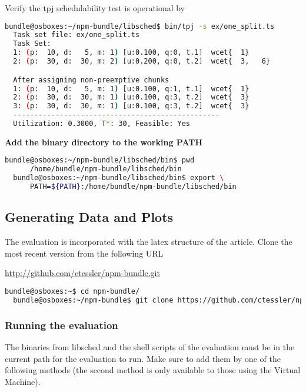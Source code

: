 \documentclass[a4paper]{article}
\begin{document}
{\noindent}Verify the tpj schedulability test is operational by
\begin{lstlisting}[language=bash]
  bundle@osboxes:~/npm-bundle/libsched$ bin/tpj -s ex/one_split.ts
  Task set file: ex/one_split.ts
  Task Set:
  1: (p:  10, d:   5, m: 1) [u:0.100, q:0, t.1]  wcet{  1}
  2: (p:  30, d:  30, m: 2) [u:0.200, q:0, t.2]  wcet{  3,   6}

  After assigning non-preemptive chunks
  1: (p:  10, d:   5, m: 1) [u:0.100, q:1, t.1]  wcet{  1}
  2: (p:  30, d:  30, m: 1) [u:0.100, q:3, t.2]  wcet{  3}
  3: (p:  30, d:  30, m: 1) [u:0.100, q:3, t.2]  wcet{  3}
  -------------------------------------------------
  Utilization: 0.3000, T*: 30, Feasible: Yes
\end{lstlisting}

{\noindent}\textbf{Add the binary directory to the working PATH}
\begin{lstlisting}[language=bash]
  bundle@osboxes:~/npm-bundle/libsched/bin$ pwd
      /home/bundle/npm-bundle/libsched/bin
  bundle@osboxes:~/npm-bundle/libsched/bin$ export \
      PATH=${PATH}:/home/bundle/npm-bundle/libsched/bin
\end{lstlisting}

\subsection{Generating Data and Plots}

The evaluation is incorporated with the latex structure of the
article. Clone the most recent version from the following URL

\href{http://github.com/ctessler/npm-bundle.git}{http://github.com/ctessler/npm-bundle.git}

\begin{lstlisting}[language=bash]
  bundle@osboxes:~$ cd npm-bundle/
  bundle@osboxes:~/npm-bundle$ git clone https://github.com/ctessler/npm-bundle.git
\end{lstlisting}

\subsubsection{Running the evaluation}\label{sec:running}

The binaries from libsched and the shell scripts of the evaluation
must be in the current path for the evaluation to run. Make sure to
add them by one of the following methods (the second method is only
available to those using the Virtual Machine).
\end{document}
